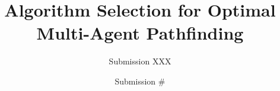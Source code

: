 \documentclass[letterpaper]{article} %
\author{Submission XXX}
\begin{document}
\title{Algorithm Selection for Optimal Multi-Agent Pathfinding}







\author{Submission \#}

\maketitle
\end{document}
